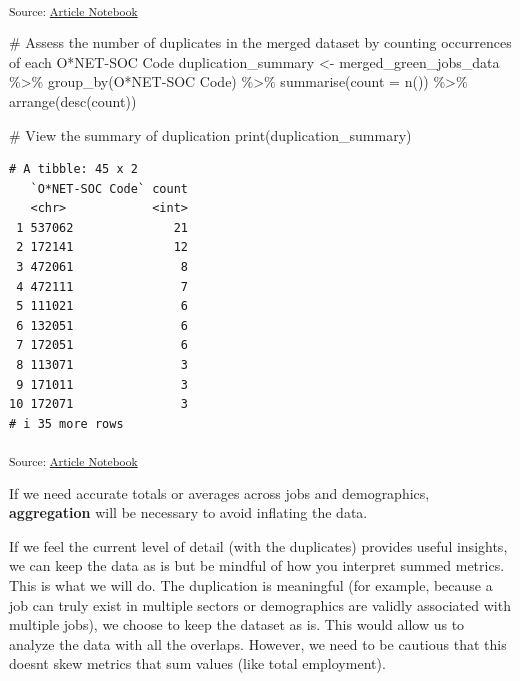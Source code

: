 \documentclass[
  letterpaper,
  DIV=11,
  numbers=noendperiod]{scrartcl}
\newenvironment{Shaded}{\begin{snugshade}}{\end{snugshade}}
\newcommand{\AttributeTok}[1]{\textcolor[rgb]{0.40,0.45,0.13}{#1}}
\newcommand{\CommentTok}[1]{\textcolor[rgb]{0.37,0.37,0.37}{#1}}
\newcommand{\FunctionTok}[1]{\textcolor[rgb]{0.28,0.35,0.67}{#1}}
\newcommand{\NormalTok}[1]{\textcolor[rgb]{0.00,0.23,0.31}{#1}}
\newcommand{\OtherTok}[1]{\textcolor[rgb]{0.00,0.23,0.31}{#1}}
\newcommand{\SpecialCharTok}[1]{\textcolor[rgb]{0.37,0.37,0.37}{#1}}
\newcommand{\StringTok}[1]{\textcolor[rgb]{0.13,0.47,0.30}{#1}}
\begin{document}
\textsubscript{Source:
\href{https://beeckcenter.github.io/climate-equity-workforce/index-preview.html}{Article
Notebook}}

\begin{Shaded}
\begin{Highlighting}[]
\CommentTok{\# Assess the number of duplicates in the merged dataset by counting occurrences of each O*NET{-}SOC Code}
\NormalTok{duplication\_summary }\OtherTok{\textless{}{-}}\NormalTok{ merged\_green\_jobs\_data }\SpecialCharTok{\%\textgreater{}\%}
  \FunctionTok{group\_by}\NormalTok{(}\StringTok{\textasciigrave{}}\AttributeTok{O*NET{-}SOC Code}\StringTok{\textasciigrave{}}\NormalTok{) }\SpecialCharTok{\%\textgreater{}\%}
  \FunctionTok{summarise}\NormalTok{(}\AttributeTok{count =} \FunctionTok{n}\NormalTok{()) }\SpecialCharTok{\%\textgreater{}\%}
  \FunctionTok{arrange}\NormalTok{(}\FunctionTok{desc}\NormalTok{(count))}

\CommentTok{\# View the summary of duplication}
\FunctionTok{print}\NormalTok{(duplication\_summary)}
\end{Highlighting}
\end{Shaded}

\begin{verbatim}
# A tibble: 45 x 2
   `O*NET-SOC Code` count
   <chr>            <int>
 1 537062              21
 2 172141              12
 3 472061               8
 4 472111               7
 5 111021               6
 6 132051               6
 7 172051               6
 8 113071               3
 9 171011               3
10 172071               3
# i 35 more rows
\end{verbatim}

\textsubscript{Source:
\href{https://beeckcenter.github.io/climate-equity-workforce/index-preview.html}{Article
Notebook}}

If we need accurate totals or averages across jobs and demographics,
\textbf{aggregation} will be necessary to avoid inflating the data.

If we feel the current level of detail (with the duplicates) provides
useful insights, we can keep the data as is but be mindful of how you
interpret summed metrics. This is what we will do. The duplication is
meaningful (for example, because a job can truly exist in multiple
sectors or demographics are validly associated with multiple jobs), we
choose to keep the dataset as is. This would allow us to analyze the
data with all the overlaps. However, we need to be cautious that this
doesn\textquotesingle t skew metrics that sum values (like total
employment).
\end{document}
